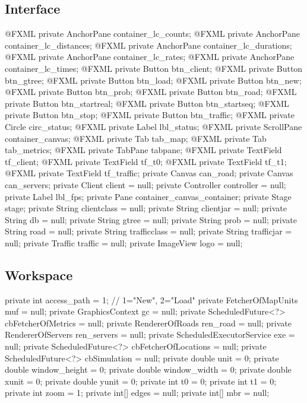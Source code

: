 \subsection{Interface}
\nwenddocs{}\plusendmoddef
@FXML private AnchorPane container_lc_counts;
@FXML private AnchorPane container_lc_distances;
@FXML private AnchorPane container_lc_durations;
@FXML private AnchorPane container_lc_rates;
@FXML private AnchorPane container_lc_times;
@FXML private Button btn_client;
@FXML private Button btn_gtree;
@FXML private Button btn_load;
@FXML private Button btn_new;
@FXML private Button btn_prob;
@FXML private Button btn_road;
@FXML private Button btn_startreal;
@FXML private Button btn_startseq;
@FXML private Button btn_stop;
@FXML private Button btn_traffic;
@FXML private Circle circ_status;
@FXML private Label lbl_status;
@FXML private ScrollPane container_canvas;
@FXML private Tab tab_map;
@FXML private Tab tab_metrics;
@FXML private TabPane tabpane;
@FXML private TextField tf_client;
@FXML private TextField tf_t0;
@FXML private TextField tf_t1;
@FXML private TextField tf_traffic;
private Canvas can_road;
private Canvas can_servers;
private Client client = null;
private Controller controller = null;
private Label lbl_fps;
private Pane container_canvas_container;
private Stage stage;
private String clientclass = null;
private String clientjar = null;
private String db = null;
private String gtree = null;
private String prob = null;
private String road = null;
private String trafficclass = null;
private String trafficjar = null;
private Traffic traffic = null;
private ImageView logo = null;
\nwendcode{}\nwdocspar

\subsection{Workspace}
\nwenddocs{}\plusendmoddef
private int access_path = 1;  // 1="New", 2="Load"
private FetcherOfMapUnits muf = null;
private GraphicsContext gc = null;
private ScheduledFuture<?> cbFetcherOfMetrics = null;
private RendererOfRoads ren_road = null;
private RendererOfServers ren_servers = null;
private ScheduledExecutorService exe = null;
private ScheduledFuture<?> cbFetcherOfLocations = null;
private ScheduledFuture<?> cbSimulation = null;
private double unit = 0;
private double window_height = 0;
private double window_width = 0;
private double xunit = 0;
private double yunit = 0;
private int t0 = 0;
private int t1 = 0;
private int zoom = 1;
private int[] edges = null;
private int[] mbr = null;
\nwendcode{}\nwdocspar

